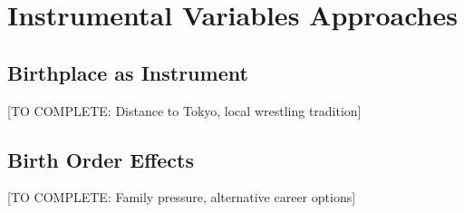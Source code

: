 \section{Instrumental Variables Approaches}

\subsection{Birthplace as Instrument}

[TO COMPLETE: Distance to Tokyo, local wrestling tradition]

\subsection{Birth Order Effects}

[TO COMPLETE: Family pressure, alternative career options]